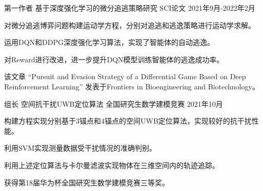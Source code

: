 

\begin{cventries}

  \cventry
    {第一作者} %
    {基于深度强化学习的微分追逃策略研究} %
    {SCI论文} %
    {2021年9月-2022年2月} %
    {
      \begin{cvitems} %
        \item {对微分追逃博弈问题构建运动学方程，分别对追逃和逃逸策略进行运动学求解。}
        \item {运用DQN和DDPG深度强化学习算法，实现了智能体的自动逃逸。}
        \item {对Reward进行改进，进一步提升DQN模型训练智能体的逃逸成功率。}
        \item {该文章 “Pursuit and Evasion Strategy of a Differential Game Based on Deep Reinforcement Learning” 发表于Frontiers in Bioengineering and Biotechnology。}
      \end{cvitems}
    }

  \cventry
    {组长} %
    {空间抗干扰UWB定位算法} %
    {全国研究生数学建模竞赛} %
    {2021年10月} %
    {
      \begin{cvitems} %
        \item {构建方程实现分别基于3锚点和4锚点的空间UWB定位算法，实现较好的抗干扰性能。}
        \item {利用SVM实现测量数据受干扰情况的准确判别。}
        \item {利用上述定位算法与卡尔曼滤波实现物体在三维空间内的轨迹追踪。}
        \item {获得第18届华为杯全国研究生数学建模竞赛三等奖。}
      \end{cvitems}
    }


\end{cventries}
